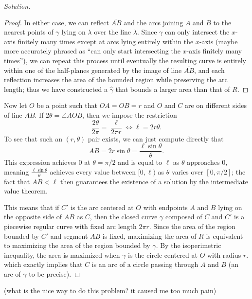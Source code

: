 \documentclass[11pt]{scrartcl}
\providecommand{\ol}{\overline}
\newenvironment{soln}{\begin{proof}[Solution]}{\end{proof}}
\begin{document}
\begin{soln}
\begin{proof}
		In either case, we can reflect $\ol{AB}$
		and the arcs joining $A$ and $B$ to the nearest points of $\gamma$
		lying on $\lambda$ over the line $\lambda$.
		Since $\gamma$ can only intersect the $x$-axis finitely many times
		except at arcs lying entirely within the $x$-axis
		(maybe more accurately phrased as ``can only start intersecting
		the $x$-axis finitely many times''), we can repeat this process
		until eventually the resulting curve is entirely within
		one of the half-planes generated by the image of line $\ol{AB}$,
		and each reflection increases the area of the bounded region
		while preserving the arc length; thus we have constructed
		a $\widehat\gamma$ that bounds a larger area than that of $R$.
	\end{proof}
	
	Now let $O$ be a point such that $OA = OB = r$
	and $O$ and $C$ are on different sides of line $AB$.
	If $2\theta = \angle AOB$, then we impose the restriction
	\[\frac{2\theta}{2\pi} = \frac{\ell}{2\pi r}\iff
	\ell = 2r\theta.\]
	To see that such an $(r, \theta)$ pair exists, we can just
	compute directly that
	\[AB = 2r\sin\theta = \frac{\ell\sin\theta}{\theta}.\]
	This expression achieves $0$ at $\theta = \pi/2$ and is equal to $\ell$
	as $\theta$ approaches $0$, meaning $\frac{\ell\sin\theta}{\theta}$
	achieves every value between $[0,\ell)$ as $\theta$ varies
	over $[0,\pi/2]$; the fact that $AB < \ell$ then
	guarantees the existence of a solution by the intermediate value theorem.
	
	This means that if $C'$ is the arc centered at $O$
	with endpoints $A$ and $B$ lying on the opposite side of $AB$ as $C$,
	then the closed curve $\gamma$ composed of $C$ and $C'$
	is a piecewise regular curve with fixed arc length $2\pi r$.
	Since the area of the region bounded by $C'$ and segment $AB$ is fixed,
	maximizing the area of $R$ is equivalent to maximizing the area
	of the region bounded by $\gamma$. By the isoperimetric inequality,
	the area is maximized when $\gamma$ is the circle centered at $O$
	with radius $r$. which exactly implies that $C$ is an arc of a circle
	passing through $A$ and $B$ (an arc of $\gamma$ to be precise).
\end{soln}

(what is the nice way to do this problem? it caused me too much pain)
\end{document}
